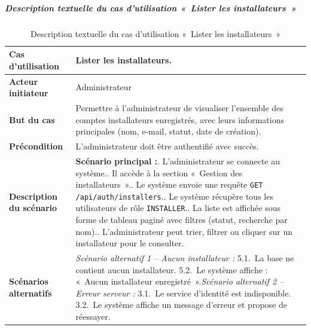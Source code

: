 \subparagraph{Description textuelle du cas d'utilisation «~Lister les installateurs~»}

\begin{table}[H]
  \caption{Description textuelle du cas d'utilisation «~Lister les installateurs~»}
  \label{tab:cu-lister-installateurs}
  \centering
  \begin{tabularx}{\textwidth}{|L{3.8cm}|X|}
    \hline
    \textbf{Cas d'utilisation} & Lister les installateurs. \\
    \hline
    \textbf{Acteur initiateur} & Administrateur \\
    \hline
    \textbf{But du cas} & Permettre à l'administrateur de visualiser l'ensemble des comptes installateurs enregistrés, avec leurs informations principales (nom, e-mail, statut, date de création). \\
    \hline
    \textbf{Précondition} & L'administrateur doit être authentifié avec succès. \\
    \hline
    \textbf{Description du scénario} &
    \textbf{Scénario principal :}. L'administrateur se connecte au système.. Il accède à la section «~Gestion des installateurs~».. Le système envoie une requête \texttt{GET /api/auth/installers}.. Le système récupère tous les utilisateurs de rôle \texttt{INSTALLER}.. La liste est affichée sous forme de tableau paginé avec filtres (statut, recherche par nom).. L'administrateur peut trier, filtrer ou cliquer sur un installateur pour le consulter.\\
    \hline
    \textbf{Scénarios alternatifs} &
    \textit{Scénario alternatif 1 -- Aucun installateur :}\newline
    \hspace*{6pt}5.1.~La base ne contient aucun installateur.\newline
    \hspace*{6pt}5.2.~Le système affiche : «~Aucun installateur enregistré~».\newline[2pt]
    \textit{Scénario alternatif 2 -- Erreur serveur :}\newline
    \hspace*{6pt}3.1.~Le service d'identité est indisponible.\newline
    \hspace*{6pt}3.2.~Le système affiche un message d'erreur et propose de réessayer.\\
    \hline
  \end{tabularx}
\end{table}

